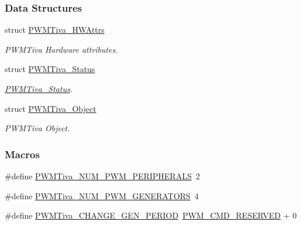 \subsubsection*{Data Structures}
\begin{DoxyCompactItemize}
\item 
struct \hyperlink{struct_p_w_m_tiva___h_w_attrs}{P\+W\+M\+Tiva\+\_\+\+H\+W\+Attrs}
\begin{DoxyCompactList}\small\item\em P\+W\+M\+Tiva Hardware attributes. \end{DoxyCompactList}\item 
struct \hyperlink{struct_p_w_m_tiva___status}{P\+W\+M\+Tiva\+\_\+\+Status}
\begin{DoxyCompactList}\small\item\em \hyperlink{struct_p_w_m_tiva___status}{P\+W\+M\+Tiva\+\_\+\+Status}. \end{DoxyCompactList}\item 
struct \hyperlink{struct_p_w_m_tiva___object}{P\+W\+M\+Tiva\+\_\+\+Object}
\begin{DoxyCompactList}\small\item\em P\+W\+M\+Tiva Object. \end{DoxyCompactList}\end{DoxyCompactItemize}
\subsubsection*{Macros}
\begin{DoxyCompactItemize}
\item 
\#define \hyperlink{_p_w_m_tiva_8h_ad09ddba586142f79c3c6ad6eae017374}{P\+W\+M\+Tiva\+\_\+\+N\+U\+M\+\_\+\+P\+W\+M\+\_\+\+P\+E\+R\+I\+P\+H\+E\+R\+A\+L\+S}~2
\item 
\#define \hyperlink{_p_w_m_tiva_8h_a3b71203004a2bad6632936ac4d7274de}{P\+W\+M\+Tiva\+\_\+\+N\+U\+M\+\_\+\+P\+W\+M\+\_\+\+G\+E\+N\+E\+R\+A\+T\+O\+R\+S}~4
\item 
\#define \hyperlink{_p_w_m_tiva_8h_ae8518cd9113b2c8c7d671f391d0f82fd}{P\+W\+M\+Tiva\+\_\+\+C\+H\+A\+N\+G\+E\+\_\+\+G\+E\+N\+\_\+\+P\+E\+R\+I\+O\+D}~\hyperlink{_p_w_m_8h_ad731f4db58c72d280900da4be6e3434c}{P\+W\+M\+\_\+\+C\+M\+D\+\_\+\+R\+E\+S\+E\+R\+V\+E\+D} + 0
\end{DoxyCompactItemize}
